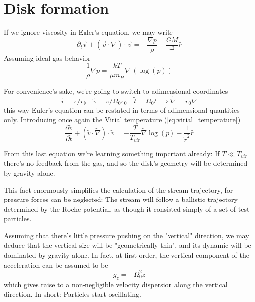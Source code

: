 \section{Disk formation}
If we ignore viscosity in Euler's equation, we may write
\begin{equation*}
    \partial_{t}\vec{v} + (\vec{v}\cdot \nabla)\cdot \vec{v} = -\frac{\nabla p}{\rho} -\frac{GM}{r^{2}}\hat{r}
\end{equation*}
Assuming ideal gas behavior
\begin{equation*}
    \frac{1}{\rho}\nabla p = \frac{kT}{\mu m_{H}}\nabla\,(\log(p))
\end{equation*}
\par For convenience's sake, we're going to switch to adimensional coordinates
\begin{equation*}
    \tilde{r} = r/r_{0} \quad \tilde{v} = v/\Omega_{0}r_{0} \quad \tilde{t} = \Omega_{0}t \implies \tilde{\nabla} = r_{0}\nabla
\end{equation*}
this way Euler's equation can be restated in terms of adimensional quantities only. Introducing once again the Virial temperature (\ref{eq:virial_temperature})
\begin{equation*}
    \frac{\partial \tilde{v}}{\partial \tilde{t}} + (\tilde{v}\cdot \tilde{\nabla})\cdot \tilde{v} = -\frac{T}{T_{vir}}\tilde{\nabla}\log(p)-\frac{1}{\tilde{r}^{2}}\hat{r}
\end{equation*}
\par From this last equation we're learning something important already: If $T \ll T_{vir}$ there's no feedback from the gas, and so the disk's geometry will be determined by gravity alone. 
\par This fact enormously simplifies the calculation of the stream trajectory, for pressure forces can be neglected: The stream will follow a ballistic trajectory determined by the Roche potential, as though it consisted simply of a set of test particles.
\par Assuming that there's little pressure pushing on the "vertical" direction, we may deduce that the vertical size will be "geometrically thin", and its dynamic will be dominated by gravity alone. In fact, at first order, the vertical component of the acceleration can be assumed to be
\begin{equation*}
    g_{z} = -\Omega_{0}^{2}z
\end{equation*}
which gives raise to a non-negligible velocity dispersion along the vertical direction. In short: Particles start oscillating.
